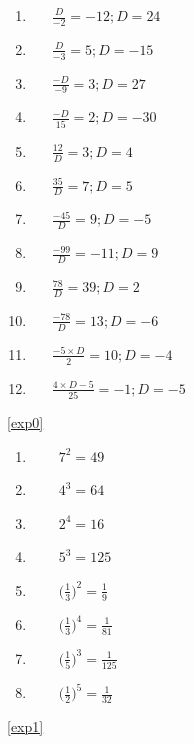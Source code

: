 \documentclass[a4paper,12pt]{article}
\begin{document}
\begin{multicols}{3}
	\begin{enumerate}[label=\footnotesize \roman*)]
		\item~~~$\displaystyle \frac{D}{-2}=-12; D=24$
		\item~~~$\displaystyle \frac{D}{-3}=5; D=-15$
		\item~~~$\displaystyle \frac{-D}{-9}=3; D=27$
		\item~~~$\displaystyle \frac{-D}{15}=2; D=-30$
		\item~~~$\displaystyle \frac{12}{D}=3; D=4$
		\item~~~$\displaystyle \frac{35}{D}=7; D=5$
		\item~~~$\displaystyle \frac{-45}{D}=9; D=-5$
		\item~~~$\displaystyle \frac{-99}{D}=-11; D=9$
		\item~~~$\displaystyle \frac{78}{D}=39; D=2$
		\item~~~$\displaystyle \frac{-78}{D}=13; D=-6$
		\item~~~$\displaystyle \frac{-5\times D}{2}=10; D=-4$
		\item~~~$\displaystyle \frac{4 \times D -5}{25}= -1; D=-5$
	\end{enumerate}
\end{multicols}
\ref{exp0}
\begin{multicols}{3}
	\begin{enumerate}
		\item ~~~~$7^{2}=49$
		\item ~~~~$4^{3}=64$
		\item ~~~~$2^{4}=16$
		\item ~~~~$5^{3}=125$
		\item ~~~~$\displaystyle \Big(\frac{1}{3}\Big)^{2}=\frac{1}{9}$
		\item ~~~~$\displaystyle \Big(\frac{1}{3}\Big)^{4}=\frac{1}{81}$
		\item ~~~~$\displaystyle \Big(\frac{1}{5}\Big)^{3}=\frac{1}{125}$
		\item ~~~~$\displaystyle \Big(\frac{1}{2}\Big)^{5}=\frac{1}{32}$
	\end{enumerate}
\end{multicols}
\ref{exp1}
\end{document}
